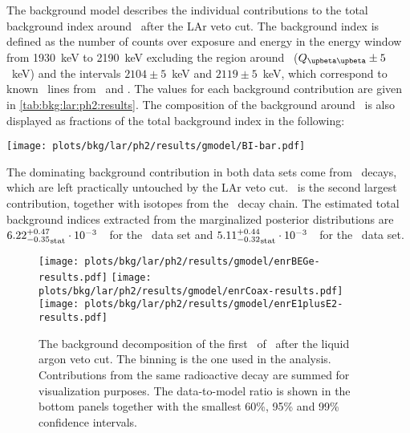 The background model describes the individual contributions to the total background index
around \qbb\ after the LAr veto cut. The background index is defined as the number
of counts over exposure and energy in the energy window from 1930~keV to 2190~keV
excluding the region around \qbb\ ($\qbbM \pm 5$~keV) and the intervals $2104 \pm 5$~keV
and $2119 \pm 5$~keV, which correspond to known \g\ lines from \Tl\ and \Bih. The values
for each background contribution are given in \cref{tab:bkg:lar:ph2:results}. The
composition of the background around \qbb\ is also displayed as fractions of the total
background index in the following:
\begin{center}
  \texttt{[image: plots/bkg/lar/ph2/results/gmodel/BI-bar.pdf]}
\end{center}
The dominating background contribution in both data sets come from
\a\ decays, which are left practically untouched by the LAr veto cut. \kvz\ is the second
largest contribution, together with isotopes from the \Uh\ decay chain.
The estimated total
background indices extracted from the marginalized posterior distributions are
${6.22^{+0.47}_{-0.35}}_\text{stat} \cdot 10^{-3}$~\ctsper\ for the \enrBEGeII\ data set and
${5.11^{+0.44}_{-0.32}}_\text{stat} \cdot 10^{-3}$~\ctsper\ for the \enrCoaxII\ data set.

\begin{sidewaystable}
  \footnotesize
  \centering
  \caption{%
    Summary of the background decomposition after LAr veto cut. The number of
    reconstructed counts in the fit range and the BI at \qbb\ is listed for each component
    and each analysis data set. Marginalized modes, along with its smallest 68\% C.I., are
    reported as representatives of the marginalized posterior distributions.
  }\label{tab:bkg:lar:ph2:results}
  
\end{sidewaystable}

\begin{figure}
  \centering
  \texttt{[image: plots/bkg/lar/ph2/results/gmodel/enrBEGe-results.pdf]}
  \texttt{[image: plots/bkg/lar/ph2/results/gmodel/enrCoax-results.pdf]}
  \texttt{[image: plots/bkg/lar/ph2/results/gmodel/enrE1plusE2-results.pdf]}
  \caption{%
    The background decomposition of the first \gexpophasetwobkg\ of \gerdatwo\ after the
    liquid argon veto cut. The binning is the one used in the analysis. Contributions from
    the same radioactive decay are summed for visualization purposes. The data-to-model
    ratio is shown in the bottom panels together with the smallest 60\%, 95\% and 99\%
    confidence intervals.
  }\label{fig:bkg:lar:ph2:results}
\end{figure}

